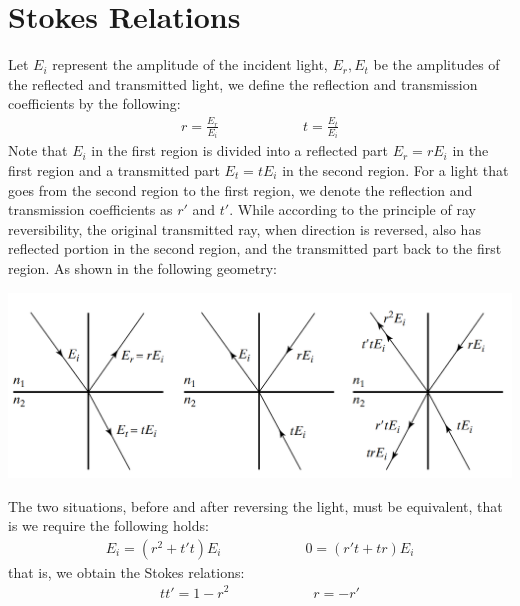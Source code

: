 \documentclass[11pt]{book}
\theoremstyle{break}
\theoremstyle{break}
\begin{document}
\section[Stokes Relations]{\color{red}Stokes Relations\color{black}}
Let $E_i$ represent the amplitude of the incident light, $E_r, E_t$ be the amplitudes of the reflected and transmitted light, we define the reflection and transmission coefficients by the following:
\begin{align*}
r = \frac{E_r}{E_i} \qquad\qquad\qquad t = \frac{E_t}{E_i}
\end{align*}
Note that $E_i$ in the first region is divided into a reflected part $E_r = rE_i$ in the first region and a transmitted part $E_t = tE_i$ in the second region. For a light that goes from the second region to the first region, we denote the reflection and transmission coefficients as $r'$ and $t'$. While according to the principle of ray reversibility, the original transmitted ray, when direction is reversed, also has reflected portion in the second region, and the transmitted part back to the first region. As shown in the following geometry:
\begin{center}
\includegraphics[scale=0.39]{stokes.png}
\end{center}
The two situations, before and after reversing the light, must be equivalent, that is we require the following holds:
\begin{align*}
E_i = (r^2 + t't) E_i \qquad\qquad\qquad 0 = (r't+tr)E_i
\end{align*}
that is, we obtain the Stokes relations:
\begin{align*}
tt' = 1-r^2 \qquad \qquad \qquad r= -r'
\end{align*}

\newpage
\end{document}
